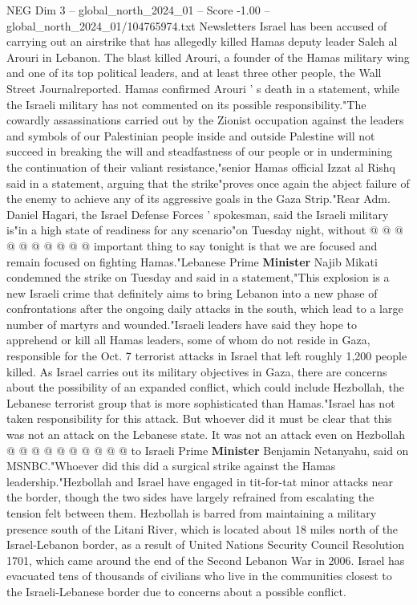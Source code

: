 \begin{textsample}{NEG Dim 3 – global\_north\_2024\_01 – Score -1.00 – global\_north\_2024\_01/104765974.txt}  \label{ex:f3_neg_212}
Newsletters Israel has been accused of carrying out an airstrike that has allegedly killed Hamas deputy leader Saleh al Arouri in Lebanon.
The blast killed Arouri, a founder of the Hamas military wing and one of its top political leaders, and at least three other people, the Wall Street Journalreported.
Hamas confirmed Arouri ' s death in a statement, while the Israeli military has not commented on its possible responsibility."The cowardly assassinations carried out by the Zionist occupation against the leaders and symbols of our Palestinian people inside and outside Palestine will not succeed in breaking the will and steadfastness of our people or in undermining the continuation of their valiant resistance,"senior Hamas official Izzat al Rishq said in a statement, arguing that the strike"proves once again the abject failure of the enemy to achieve any of its aggressive goals in the Gaza Strip."Rear Adm.
Daniel Hagari, the Israel Defense Forces ' spokesman, said the Israeli military is"in a high state of readiness for any scenario"on Tuesday night, without @ @ @ @ @ @ @ @ @ @ important thing to say tonight is that we are focused and remain focused on fighting Hamas."Lebanese Prime \textbf{Minister} Najib Mikati condemned the strike on Tuesday and said in a statement,"This explosion is a new Israeli crime that definitely aims to bring Lebanon into a new phase of confrontations after the ongoing daily attacks in the south, which lead to a large number of martyrs and wounded."Israeli leaders have said they hope to apprehend or kill all Hamas leaders, some of whom do not reside in Gaza, responsible for the Oct. 7 terrorist attacks in Israel that left roughly 1,200 people killed.
As Israel carries out its military objectives in Gaza, there are concerns about the possibility of an expanded conflict, which could include Hezbollah, the Lebanese terrorist group that is more sophisticated than Hamas."Israel has not taken responsibility for this attack.
But whoever did it must be clear that this was not an attack on the Lebanese state.
It was not an attack even on Hezbollah @ @ @ @ @ @ @ @ @ @ to Israeli Prime \textbf{Minister} Benjamin Netanyahu, said on MSNBC."Whoever did this did a surgical strike against the Hamas leadership."Hezbollah and Israel have engaged in tit-for-tat minor attacks near the border, though the two sides have largely refrained from escalating the tension felt between them.
Hezbollah is barred from maintaining a military presence south of the Litani River, which is located about 18 miles north of the Israel-Lebanon border, as a result of United Nations Security Council Resolution 1701, which came around the end of the Second Lebanon War in 2006.
Israel has evacuated tens of thousands of civilians who live in the communities closest to the Israeli-Lebanese border due to concerns about a possible conflict.

\end{textsample}
